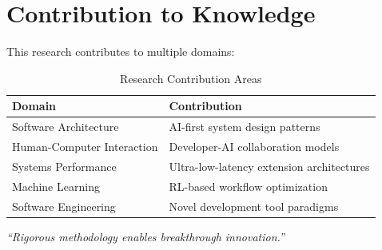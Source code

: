 \section*{Contribution to Knowledge}

This research contributes to multiple domains:

\begin{table}[ht]
\centering
\begin{tabular}{@{}ll@{}}
\toprule
\textbf{Domain} & \textbf{Contribution} \\
\midrule
Software Architecture & AI-first system design patterns \\
Human-Computer Interaction & Developer-AI collaboration models \\
Systems Performance & Ultra-low-latency extension architectures \\
Machine Learning & RL-based workflow optimization \\
Software Engineering & Novel development tool paradigms \\
\bottomrule
\end{tabular}
\caption{Research Contribution Areas}
\end{table}

\vspace{0.5cm}
\begin{center}
\textit{``Rigorous methodology enables breakthrough innovation.''}
\end{center}

\clearpage
